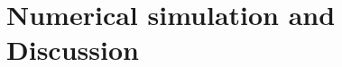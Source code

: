 \documentclass[
aps,
pra,
twocolumn,
floatfix,
]{revtex4-2}
\theoremstyle{plain}
\theoremstyle{definition}
\begin{document}



\section{Numerical simulation and Discussion}\label{sec:numerical_simulation}
\end{document}
